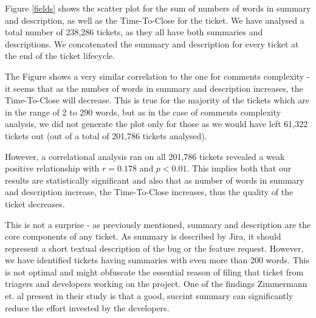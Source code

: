 \documentclass{mpaper}
\begin{document}
Figure \ref{fields} shows the scatter plot for the sum of numbers of words in summary and description, as well 
as the Time-To-Close for the ticket. We have analysed a total number of 238,286 tickets, as they all have both 
summaries and descriptions. We concatenated the summary and description for every ticket at the end of the ticket 
lifecycle.

The Figure shows a very similar correlation to the one for comments complexity - it seems that as the number of words 
in summary and description increases, the Time-To-Close will decrease. This is true for the majority of the tickets 
which are in the range of 2 to 290 words, but as in the case of comments complexity analysis, we did not generate 
the plot only for those as we would have left 61,322 tickets out (out of a total of 201,786 tickets analysed). 

However, a correlational analysis ran on all 201,786 tickets revealed a weak positive relationship with $r = 0.178$ and $p < 0.01$. 
This implies both that our results are statistically significant and also that as number of words in summary and description increase, 
the Time-To-Close increases, thus the quality of the ticket decreases.

This is not a surprise - as previously mentioned, summary and description are the core components of any ticket. 
As summary is described by Jira, it should represent a short textual description of the bug or the feature request. However,
we have identified tickets having summaries with even more than 200 words. This is not optimal and might obfuscate
the essential reason of filing that ticket from triagers and developers working on the project. One of the findings 
Zimmermann et. al \cite{zimmermann2010makes} present in their study is that a good, succint summary can significantly 
reduce the effort invested by the developers. 
\end{document}
